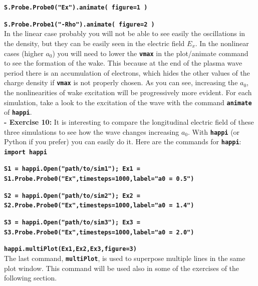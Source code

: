 \documentclass[a4paper,12pt]{extarticle}
\newcommand{\commandline}[1]{\texttt{\textbf{#1}}}
\begin{document}
\commandline{S.Probe.Probe0("Ex").animate( figure=1 )}

\commandline{S.Probe.Probe1("-Rho").animate( figure=2 )}\\

In the linear case probably you will not be able to see easily the oscillations in the density, but they can be easily seen in the electric field $E_x$. In the nonlinear cases (higher $a_0$) you will need to lower the \commandline{vmax} in the plot/animate command to see the formation of  the wake. This because at the end of the plasma wave period there is an accumulation of electrons, which hides the other values of the charge density if \commandline{vmax}  is not properly chosen.
As you can see, increasing the $a_0$, the nonlinearities of wake excitation will be progressively more evident. For each simulation, take a look to the excitation of the wave with the command \commandline{animate} of \commandline{happi}.\\

\textbf{ - Exercise 10:} It is interesting to compare the longitudinal electric field of these three simulations to see how the wave changes increasing $a_0$. With \commandline{happi} (or Python if you prefer) you can easily do it. Here are the commands for \commandline{happi}:\\

\commandline{import happi}

\small{\commandline{S1 = happi.Open("path/to/sim1"); Ex1 = S1.Probe.Probe0("Ex",timesteps=1000,label="a0 = 0.5")}}

\commandline{S2 = happi.Open("path/to/sim2"); Ex2 = S2.Probe.Probe0("Ex",timesteps=1000,label="a0 = 1.4")}

\commandline{S3 = happi.Open("path/to/sim3"); Ex3 = S3.Probe.Probe0("Ex",timesteps=1000,label="a0 = 2.0")}

\commandline{happi.multiPlot(Ex1,Ex2,Ex3,figure=3)}\\

The last command, \commandline{multiPlot}, is used to superpose multiple lines in the same plot window.  This command will be used also in some of the exercises of the following section.
\end{document}
